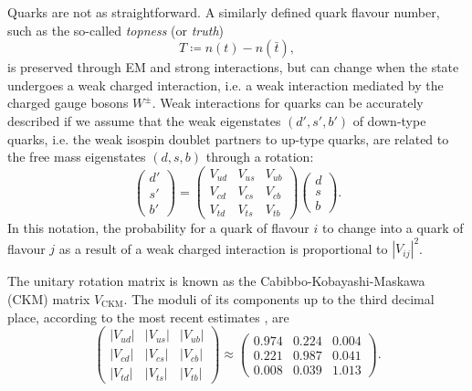 Quarks are not as straightforward.
A similarly defined quark flavour number, such as the so-called \textit{topness} (or \textit{truth})
\begin{equation}
T
\coloneqq
n(t) - n(\bar{t}),
\end{equation}
is preserved through EM and strong interactions, but can change when the state undergoes a weak charged interaction, i.e. a weak interaction mediated by the charged gauge bosons $W^\pm$. Weak interactions for quarks can be accurately described if we assume that the weak eigenstates $(d',s',b')$ of down-type quarks, i.e. the weak isospin doublet partners to up-type quarks, are related to the free mass eigenstates $(d,s,b)$ through a rotation:
\begin{equation}
	\begin{pmatrix}
		d' \\
		s' \\
		b'
	\end{pmatrix}
	=
	\begin{pmatrix}
		V_{ud} & V_{us} & V_{ub} \\
		V_{cd} & V_{cs} & V_{cb} \\
		V_{td} & V_{ts} & V_{tb}
	\end{pmatrix}
	\begin{pmatrix}
		d \\
		s \\
		b
	\end{pmatrix}.
	\label{eq:CKM-matrix-mixing}
\end{equation}
In this notation, the probability for a quark of flavour $i$ to change into a quark of flavour $j$ as a result of a weak charged interaction is proportional to ${\left| V_{ij} \right|}^2$.

The unitary rotation matrix is known as the Cabibbo-Kobayashi-Maskawa (CKM) matrix $V_\text{CKM}$. The moduli of its components up to the third decimal place, according to the most recent estimates \cite{PDG}, are
\begin{equation}
	\begin{pmatrix}
		\left|V_{ud}\right| & \left|V_{us}\right| & \left|V_{ub}\right| \\
		\left|V_{cd}\right| & \left|V_{cs}\right| & \left|V_{cb}\right| \\
		\left|V_{td}\right| & \left|V_{ts}\right| & \left|V_{tb}\right|
	\end{pmatrix}
	\approx 
	\begin{pmatrix}
		0.974 & 0.224 & 0.004 \\
		0.221 & 0.987 & 0.041 \\
		0.008 & 0.039 & 1.013
	\end{pmatrix}.
	\label{eq:CKM-matrix-numerical}
\end{equation}

